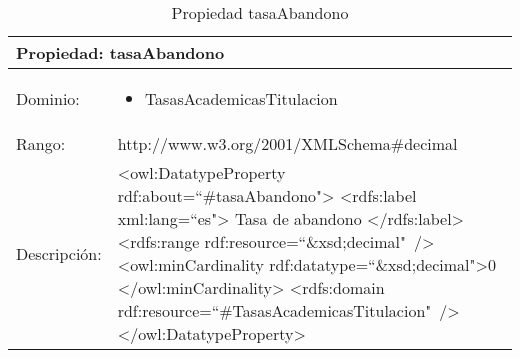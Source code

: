\begin{table}[!ht]
	\centering
	\begin{tabular}{|p{}|p{}|}
		\hline
		\multicolumn{2}{|l|}{Propiedad: \textbf{tasaAbandono}}
		\\ \hline
		Dominio:&
		\begin{itemize}
			\item TasasAcademicasTitulacion
		\end{itemize}
		\\ \hline
		Rango:&
		http://www.w3.org/2001/XMLSchema\#decimal
		\\ \hline
		Descripción:&
		\textless owl:DatatypeProperty rdf:about=``\#tasaAbandono"\textgreater\newline 
		\tab\textless rdfs:label xml:lang=``es"\textgreater\newline
		\tab\tab Tasa de abandono\newline
		\tab\textless /rdfs:label\textgreater\newline
		\tab\textless rdfs:range\newline
		\tab\tab rdf:resource=``\&xsd;decimal"\ /\textgreater\newline
		\tab\textless owl:minCardinality \newline
		\tab\tab rdf:datatype=``\&xsd;decimal"\textgreater0\newline
		\tab\textless /owl:minCardinality\textgreater\newline
		\tab\textless rdfs:domain\newline
		\tab\tab rdf:resource=``\#TasasAcademicasTitulacion"\ /\textgreater\newline
		\textless /owl:DatatypeProperty\textgreater
		\\ \hline
	\end{tabular}
	\caption{Propiedad tasaAbandono}
	\label{propiedad-tasaabandono}
\end{table}

